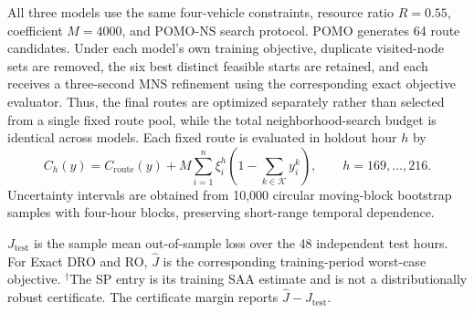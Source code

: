 \documentclass[preprint,12pt,authoryear]{elsarticle}
\theoremstyle{definition}
\begin{document}
{All three models use the same four-vehicle constraints, resource ratio $R=0.55$, coefficient $M=4000$, and POMO-NS search protocol. POMO generates 64 route candidates. Under each model's own training objective, duplicate visited-node sets are removed, the six best distinct feasible starts are retained, and each receives a three-second MNS refinement using the corresponding exact objective evaluator. Thus, the final routes are optimized separately rather than selected from a single fixed route pool, while the total neighborhood-search budget is identical across models. Each fixed route is evaluated in holdout hour $h$ by
\begin{equation}
C_h(y)=C_{\mathrm{route}}(y)+M\sum_{i=1}^{n}\xi_i^h\left(1-\sum_{k\in\mathcal{K}}y_i^k\right),
\qquad h=169,\ldots,216.
\label{eq:holdout_realized_cost}
\end{equation}
Uncertainty intervals are obtained from 10,000 circular moving-block bootstrap samples with four-hour blocks, preserving short-range temporal dependence.

\begin{table}[htbp]
\centering
\caption{Kuhn-style independent temporal holdout results. Costs are in $\times10^3$; brackets contain 95\% moving-block bootstrap intervals.}
\label{tab:temporal_holdout}
\small
{}
\parbox{0.97\textwidth}{\footnotesize $J_{\mathrm{test}}$ is the sample mean out-of-sample loss over the 48 independent test hours. For Exact DRO and RO, $\widehat J$ is the corresponding training-period worst-case objective. $^{\dagger}$The SP entry is its training SAA estimate and is not a distributionally robust certificate. The certificate margin reports $\widehat J-J_{\mathrm{test}}$.}
\end{table}

}
\end{document}
